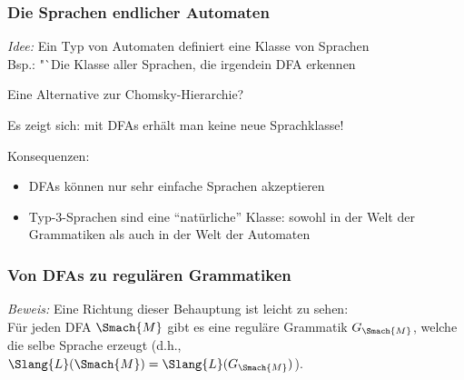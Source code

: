 \documentclass[aspectratio=1610,onlymath]{beamer}
\begin{document}
\begin{frame}

\end{frame}

\begin{frame}\frametitle{Die Sprachen endlicher Automaten}

\emph{Idee:} Ein Typ von Automaten definiert eine Klasse von Sprachen\\
Bsp.: "`Die Klasse aller Sprachen, die irgendein DFA erkennen 
\bigskip

\alert{Eine Alternative zur Chomsky-Hierarchie?}
\smallskip\pause

Es zeigt sich: mit DFAs erhält man keine neue Sprachklasse!
\medskip


Konsequenzen:
\begin{itemize}
\item DFAs können nur sehr einfache Sprachen akzeptieren
\item Typ-3-Sprachen sind eine "`natürliche"' Klasse: sowohl in der Welt der Grammatiken als auch in der Welt der Automaten
\end{itemize}



\end{frame}

\begin{frame}\frametitle{Von DFAs zu regulären Grammatiken}


\emph{Beweis:} Eine Richtung dieser Behauptung ist leicht zu sehen:\\[0.5ex]
Für jeden DFA $\Smach{M}$ gibt es eine reguläre Grammatik $G_{\Smach{M}}$, welche die selbe Sprache erzeugt (d.h., $\Slang{L}(\Smach{M})=\Slang{L}(G_{\Smach{M}})$).\smallskip\pause


\end{frame}
\end{document}
